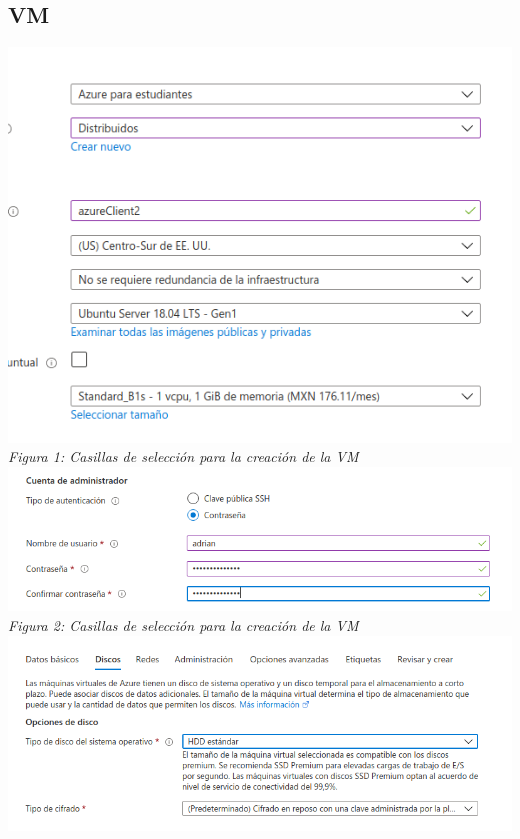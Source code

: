 \documentclass[10pt,executivepaper]{article}
\begin{document}
\subsection{VM}
\begin{center}
  \includegraphics[scale=0.5]{imgs/creacion_0.png}\\
  \textit{Figura 1: Casillas de selección para la creación de la VM}\\
  \includegraphics[scale=0.5]{imgs/creacion_1.png}\\
  \textit{Figura 2: Casillas de selección para la creación de la VM}\\
  \includegraphics[scale=0.5]{imgs/creacion_3.png}\\

\end{center}
\end{document}
